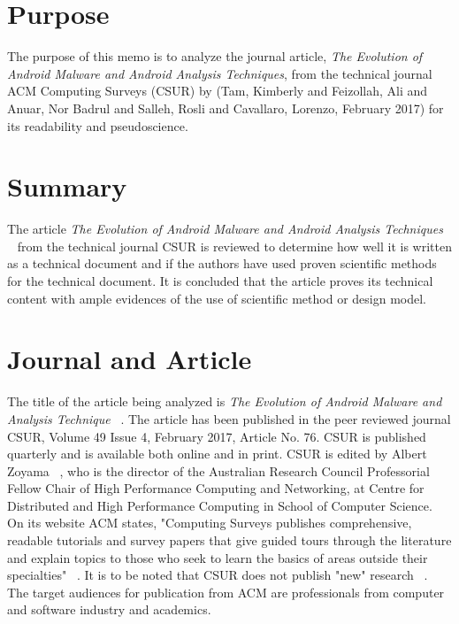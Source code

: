 \documentclass[letterpaper,10pt]{texMemo}
\begin{document}
\maketitle

\section*{Purpose}
The purpose of this memo is to analyze the journal article, \textit{The Evolution of Android Malware and Android Analysis Techniques}, from the technical journal ACM Computing Surveys (CSUR) by (Tam, Kimberly and Feizollah, Ali and Anuar, Nor Badrul and Salleh, Rosli and Cavallaro, Lorenzo, February 2017) for its readability and pseudoscience.

\section*{Summary}
The article \textit{The Evolution of Android Malware and Android Analysis Techniques} ~\cite{Tam:2017:EAM:3022634.3017427} from the technical journal CSUR is reviewed to determine how well it is written as a technical document and if the authors have used proven scientific methods for the technical document. It is concluded that the article proves its technical content with ample evidences of the use of scientific method or design model.

\section*{Journal and Article}
The title of the article being analyzed is \textit{The Evolution of Android Malware and Analysis Technique} ~\cite{Tam:2017:EAM:3022634.3017427}. The article has been published in the peer reviewed journal CSUR, Volume 49 Issue 4, February 2017, Article No. 76. CSUR is published quarterly and is available both online and in print. CSUR is edited by Albert Zoyama ~\cite{Professo38:online}, who is the director of the Australian Research Council Professorial Fellow Chair of High Performance Computing and Networking, at Centre for Distributed and High Performance Computing in School of Computer Science. On its website ACM states, "Computing Surveys publishes comprehensive, readable tutorials and survey papers that give guided tours through the literature and explain topics to those who seek to learn the basics of areas outside their specialties" ~\cite{ACMCSURE29:online}. It is to be noted that CSUR does not publish "new" research ~\cite{ACMCSURE29:online}. The target audiences for publication from ACM are professionals from computer and software industry and academics.
\end{document}

